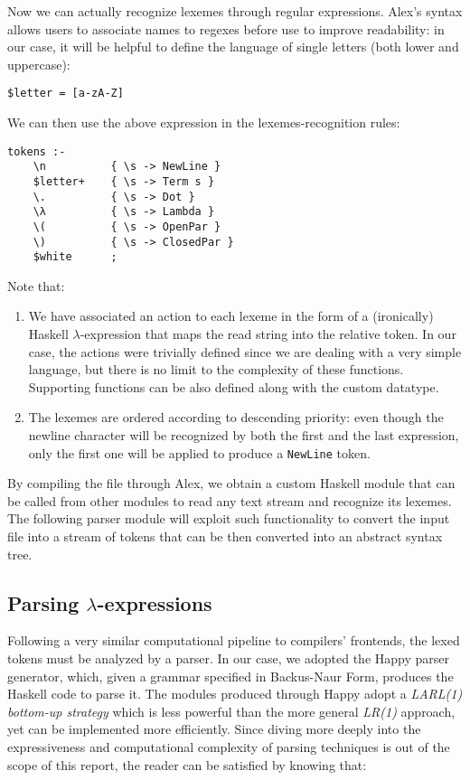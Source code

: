\documentclass{article}
\begin{document}
Now we can actually recognize lexemes through regular expressions. Alex's syntax allows users to associate names to regexes before use to improve readability: in our case, it will be helpful to define the language of single letters (both lower and uppercase):

\begin{lstlisting}
$letter = [a-zA-Z]
\end{lstlisting}

We can then use the above expression in the lexemes-recognition rules:

\begin{lstlisting}
tokens :-
    \n          { \s -> NewLine }
    $letter+    { \s -> Term s }
    \.          { \s -> Dot }
    \λ          { \s -> Lambda }
    \(          { \s -> OpenPar }
    \)          { \s -> ClosedPar }
    $white      ;
\end{lstlisting}

Note that:

\begin{enumerate}
    \item We have associated an action to each lexeme in the form of a (ironically) Haskell $\lambda$-expression that maps the read string into the relative token. In our case, the actions were trivially defined since we are dealing with a very simple language, but there is no limit to the complexity of these functions. Supporting functions can be also defined along with the custom datatype.
    \item The lexemes are ordered according to descending priority: even though the newline character will be recognized by both the first and the last expression, only the first one will be applied to produce a \lstinline|NewLine| token.
\end{enumerate}

By compiling the file through Alex, we obtain a custom Haskell module that can be called from other modules to read any text stream and recognize its lexemes. The following parser module will exploit such functionality to convert the input file into a stream of tokens that can be then converted into an abstract syntax tree.

\subsection{Parsing $\lambda$-expressions}

Following a very similar computational pipeline to compilers' frontends, the lexed tokens must be analyzed by a parser. In our case, we adopted the Happy parser generator, which, given a grammar specified in Backus-Naur Form, produces the Haskell code to parse it. The modules produced through Happy adopt a \textit{LARL(1) bottom-up strategy} which is less powerful than the more general \textit{LR(1)} approach, yet can be implemented more efficiently. Since diving more deeply into the expressiveness and computational complexity of parsing techniques is out of the scope of this report, the reader can be satisfied by knowing that:
\end{document}
